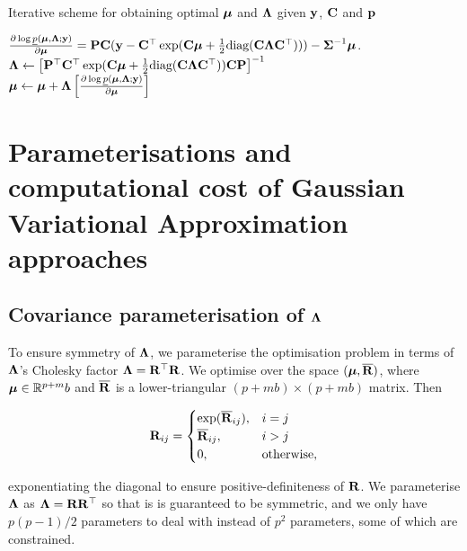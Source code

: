 \documentclass{amsart}[12pt]
\begin{document}
	\begin{algorithm}
		\caption[Algorithm GVA NR]{Iterative scheme for obtaining optimal ${\boldsymbol \mu}$ and ${\boldsymbol \Lambda}$
			given ${\bf y}$, ${\bf C}$ and ${\bf p}$}
		\label{alg:algorithm_nr}
		\begin{algorithmic}
			\REQUIRE $\frac{\partial \log \underline{p}({\boldsymbol \mu}, {\boldsymbol \Lambda}; {\bf y})}{\partial {\boldsymbol\mu}} = {\bf P} {\bf C} ({\bf y} - {\bf C}^\top \exp({\bf C} {\boldsymbol \mu} + \tfrac{1}{2} \text{diag}{({\bf C}{\boldsymbol\Lambda}{\bf C}^\top)})) - {\boldsymbol \Sigma}^{-1} {\boldsymbol \mu}$.
			\STATE ${\boldsymbol \Lambda} \leftarrow \left [ {\bf P}^\top {\bf C}^\top \exp({\bf C} {\boldsymbol \mu} + \tfrac{1}{2} \text{diag}({\bf C} {\boldsymbol \Lambda} {\bf C}^\top)) {\bf C} {\bf P} \right ]^{-1}$ \\ [1ex]
			\STATE ${\boldsymbol \mu} \leftarrow {\boldsymbol\mu} + {\boldsymbol \Lambda} \left [ \frac{\partial \log \underline{p}({\boldsymbol \mu}, {\boldsymbol \Lambda}; {\bf y})}{\partial {\boldsymbol\mu}} \right ]$
			\ENDWHILE
		\end{algorithmic}
	\end{algorithm}
		
		
	\section{Parameterisations and computational cost of Gaussian Variational Approximation approaches}
	\label{sec:param}
	\subsection{Covariance parameterisation of ${\boldsymbol \Lambda}$}

	To ensure symmetry of ${\boldsymbol \Lambda}$, we parameterise the optimisation problem in terms of ${\boldsymbol \Lambda}$'s
	Cholesky factor  ${\boldsymbol \Lambda} = {\bf R}^\top {\bf R}$. We optimise over the space $({\boldsymbol \mu}, \overline{{\bf R}})$, where ${\boldsymbol \mu}
	\in {\mathbb{R}}^{p + m}b$ and $\overline{{\bf R}}$ is a lower-triangular $(p + mb) \times (p + mb)$ matrix. Then
		
	\begin{equation*}
		{\bf R}_{ij} =
		\begin{cases}
			\exp(\overline{{\bf R}}_{ij}), & i = j             \\
			\overline{{\bf R}}_{ij},       & i > j             \\
			0,                         & \text{otherwise}, 
		\end{cases}
	\end{equation*}
		
	\noindent exponentiating the diagonal to ensure positive-definiteness of ${\bf R}$. We parameterise ${\boldsymbol \Lambda}$
	as ${\boldsymbol \Lambda} = {\bf R} {\bf R}^\top$ so that is is guaranteed to be symmetric, and we only have $p(p-1)/2$ 
	parameters to deal with instead of $p^2$ parameters, some of which are constrained. 
\end{document}
